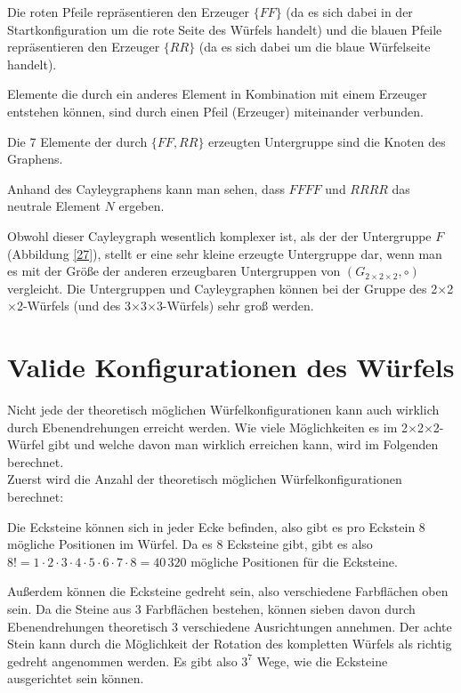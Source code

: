 \documentclass[12pt,a4paper, usenames, dvipsnames]{article}
\newcommand{\Gtwo}{\ensuremath{G_{2\times 2\times 2}}}
\newcommand{\Ttwo}{2$\times$2$\times$2-}
\newcommand{\Tthree}{3$\times$3$\times$3-}
\begin{document}
Die roten Pfeile repräsentieren den Erzeuger $\{FF\}$ (da es sich dabei in der Startkonfiguration um die rote Seite des Würfels handelt) und die blauen Pfeile repräsentieren den Erzeuger $\{RR\}$ (da es sich dabei um die blaue Würfelseite handelt).

Elemente die durch ein anderes Element in Kombination mit einem Erzeuger entstehen können, sind durch einen Pfeil (Erzeuger) miteinander verbunden.

Die 7 Elemente der durch  $\{ FF, RR \}$ erzeugten Untergruppe sind die Knoten des Graphens. 

Anhand des Cayleygraphens kann man sehen, dass $FFFF$ und $RRRR$ das neutrale Element $N$ ergeben.

Obwohl dieser Cayleygraph wesentlich komplexer ist, als der der Untergruppe $F$ (Abbildung \ref{27}), stellt er eine sehr kleine erzeugte Untergruppe dar, wenn man es mit der Größe der anderen erzeugbaren Untergruppen von $(\Gtwo, \circ)$ vergleicht. Die Untergruppen und Cayleygraphen können bei der Gruppe des \Ttwo Würfels (und des \Tthree Würfels) sehr groß werden.






%
%
%
%
%
%
%
%
%
%
%
%
%
%
%
%
%
\newpage

\section{Valide Konfigurationen des Würfels}

Nicht jede der theoretisch möglichen Würfelkonfigurationen kann auch wirklich durch Ebenendrehungen erreicht werden. Wie viele Möglichkeiten es im \Ttwo Würfel gibt und welche davon man wirklich erreichen kann, wird im Folgenden berechnet. \\


Zuerst wird die Anzahl der theoretisch möglichen Würfelkonfigurationen berechnet:


Die Ecksteine können sich in jeder Ecke befinden, also gibt es pro Eckstein 8 mögliche Positionen im Würfel. Da es 8 Ecksteine gibt, gibt es also $8! = 1 \cdot 2 \cdot 3 \cdot 4 \cdot 5 \cdot 6 \cdot 7 \cdot 8 = 40\, 320$ mögliche Positionen für die Ecksteine.


Außerdem können die Ecksteine gedreht sein, also verschiedene Farbflächen oben sein. Da die Steine aus 3 Farbflächen bestehen, können sieben davon durch Ebenendrehungen theoretisch 3 verschiedene Ausrichtungen annehmen. Der achte Stein kann durch die Möglichkeit der Rotation des kompletten Würfels als richtig gedreht angenommen werden. Es gibt also $3^7$ Wege, wie die Ecksteine ausgerichtet sein können.
\end{document}
